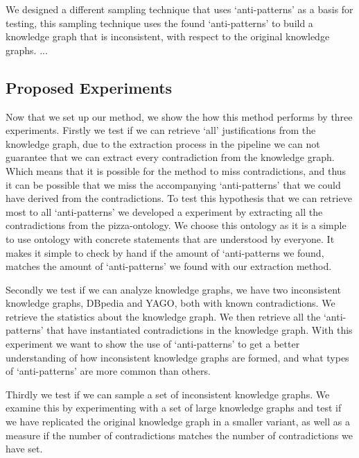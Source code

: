 \documentclass{article}
\begin{document}
We designed a different sampling technique that uses `anti-patterns' as a basis for testing, this sampling technique uses the found `anti-patterns' to build a knowledge graph that is inconsistent, with respect to the original knowledge graphs. ...

\subsection{Proposed Experiments}
Now that we set up our method, we show the how this method performs by three experiments. 
Firstly we test if we can retrieve `all' justifications from the knowledge graph, due to the extraction process in the pipeline we can not guarantee that we can extract every contradiction from the knowledge graph. Which means that it is possible for the method to miss contradictions, and thus it can be possible that we miss the accompanying `anti-patterns' that we could have derived from the contradictions. To test this hypothesis that we can retrieve most to all `anti-patterns' we developed a experiment by extracting all the contradictions from the pizza-ontology. We choose this ontology as it is a simple to use ontology with concrete statements that are understood by everyone. It makes it simple to check by hand if the amount of `anti-patterns we found, matches the amount of `anti-patterns' we found with our extraction method.

Secondly we test if we can analyze knowledge graphs, we have two inconsistent knowledge graphs, DBpedia and YAGO, both with known contradictions. We retrieve the statistics about the knowledge graph. We then retrieve all the `anti-patterns' that have instantiated contradictions in the knowledge graph. 
With this experiment we want to show the use of `anti-patterns' to get a better understanding of how inconsistent knowledge graphs are formed, and what types of `anti-patterns' are more common than others.

Thirdly we test if we can sample a set of inconsistent knowledge graphs. We examine this by experimenting with a set of large knowledge graphs and test if we have replicated the original knowledge graph in a smaller variant, as well as a measure if the number of contradictions matches the number of contradictions we have set.

\newpage
\end{document}
